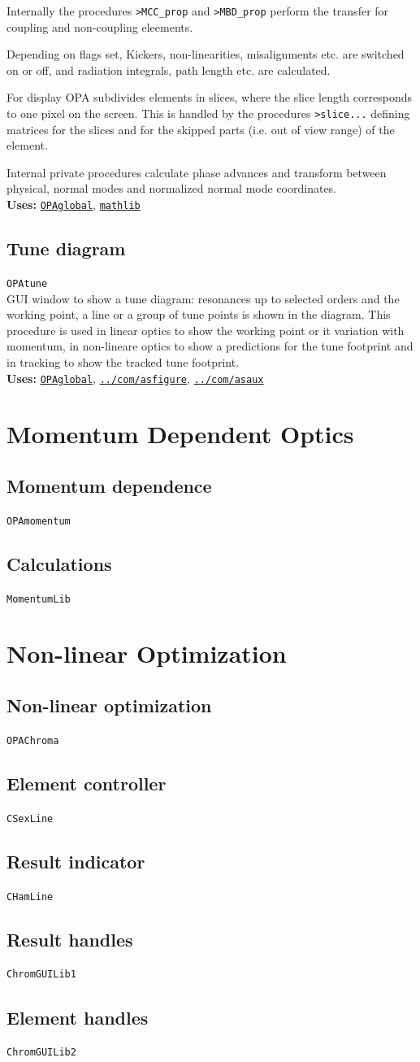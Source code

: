 \documentclass[12pt]{article}
\newcommand\code[1]{{\tt #1}}
\newcommand{\opagui}[1]{\colorbox{blue!20}{\code{#1}}}
\newcommand{\oguih}[2]{\subsection{\label{#2}#1}{\Huge\opagui{#2}}\\}
\newcommand{\opaguif}[1]{\colorbox{violet!30}{\code{#1}}}
\newcommand{\oguifh}[2]{\subsection{\label{#2}#1}{\Huge\opaguif{#2}}\\}
\newcommand{\oguif}[1]{\hyperref[#1]{\opaguif{#1}}}
\newcommand{\opauni}[1]{\colorbox{orange!30}{\code{#1}}}
\newcommand{\ounih}[2]{\subsection{\label{#2}#1}{\Huge\opauni{#2}}\\}
\newcommand{\ouni}[1]{\hyperref[#1]{\opauni{#1}}}
\newcommand{\uses}[1]{{\bf Uses: } #1}
\begin{document}
Internally the procedures \code{>MCC\_prop} and \code{>MBD\_prop} perform the transfer for coupling and non-coupling eleements.

Depending on flags set, Kickers, non-linearities, misalignments etc. are switched on or off,  and radiation integrals, path length etc. are calculated.

For display OPA subdivides elements in slices, where the slice length corresponds to one pixel on the screen. This is handled by the procedures \code{>slice...} defining matrices for the slices and for the skipped parts (i.e. out of view range) of the element.

Internal private procedures calculate phase advances and transform between physical, normal modes and normalized normal mode coordinates.\\

\uses{\ouni{OPAglobal}, \ouni{mathlib}}


\oguih{Tune diagram}{OPAtune}

GUI window to show a tune diagram: resonances up to selected orders and the working point, a line or a group of tune points is shown in the diagram. This procedure is used in linear optics to show the working point or it variation with momentum, in non-lineare optics to show a predictions for the tune footprint and in tracking to show the tracked tune footprint.\\

\uses{\ouni{OPAglobal}, \oguif{../com/asfigure}, \ouni{../com/asaux}}

\section{\label{secmomo}Momentum Dependent Optics}

\oguih{Momentum dependence}{OPAmomentum}

\ounih{Calculations}{MomentumLib} 

\section{\label{secnonl}Non-linear Optimization}

\oguih{Non-linear optimization}{OPAChroma} 

\oguifh{Element controller}{CSexLine} 

\oguifh{Result indicator}{CHamLine} 

\ounih{Result handles}{ChromGUILib1} 

\ounih{Element handles}{ChromGUILib2} 
\end{document}
